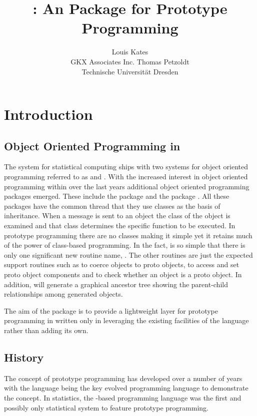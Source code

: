 \documentclass{Z}
\author{Louis Kates\\GKX Associates Inc. \And
        Thomas Petzoldt\\Technische Universit\"at Dresden}
\title{\pkg{proto}: An \proglang{R} Package for Prototype Programming}
\begin{document}
\section{Introduction} \label{sec:intro}

\subsection[Object Oriented Programming in R]{Object Oriented Programming in }

The  system for statistical computing
\citep[\url{http://www.R-project.org/}]{Rcore2005} ships with two
systems for object oriented programming referred to as 
and .  With the increased interest in object oriented
programming within  over the last years additional object
oriented programming packages emerged.  These include the 
package \citep{Bengtsson2003} and the  package
\citep[\url{http://www.omegahat.org/OOP/}]{Rnews:Chambers+Lang:2001a}.
All these packages have the common thread that they use
classes as the basis of inheritance.  When a message is sent to an
object the class of the object is examined and that class determines the
specific function to be executed. In prototype programming there
are no classes making it simple yet it retains much of the power of
class-based programming.  In the fact,  is so simple that
there is only one significant new routine name, .  The
other routines are just the expected support routines such as
 to coerce objects to proto objects, \code{\$} to
access and set proto object components and  to check
whether an object is a proto object.  In addition, 
will generate a graphical ancestor tree showing the parent-child
relationships among generated  objects.

The aim of the package is to provide a lightweight layer for prototype
programming in  written only in  leveraging the
existing facilities of the language rather than adding its own.

\subsection{History}

The concept of 
prototype programming
\citep{Lieberman1986, Taivalsaari1996a, Noble1999}
has developed over a number of years with the 
language \citep{Agesen1992}
being the key evolved programming language to demonstrate
the concept.  In statistics, the -based
 programming language \citep{Tierney1990} was
the first and possibly only statistical system to feature prototype 
programming.
\end{document}
